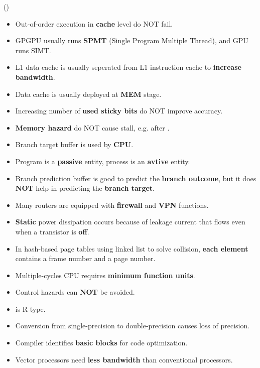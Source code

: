 \item \begin{theorem}{()} \quad\quad \begin{itemize}
        \item Out-of-order execution in \textbf{cache} level do NOT fail.
        \item GPGPU usually runs \textbf{SPMT} (Single Program Multiple Thread), and GPU runs SIMT.
        \item L1 data cache is usually seperated from L1 instruction cache to \textbf{increase bandwidth}.
        \item Data cache is usually deployed at \textbf{MEM} stage.
        \item Increasing number of \textbf{used sticky bits} do NOT improve accuracy.
        \item \textbf{Memory hazard} do NOT cause stall, e.g.  after .
        \item Branch target buffer is used by \textbf{CPU}.
        \item Program is a \textbf{passive} entity, process is an \textbf{avtive} entity.
        \item Branch prediction buffer is good to predict the \textbf{branch outcome}, but it does \textbf{NOT} help in predicting the \textbf{branch target}.
        \item Many routers are equipped with \textbf{firewall} and \textbf{VPN} functions.
        \item \textbf{Static} power dissipation occurs because of leakage current that flows even when a transistor is \textbf{off}.
        \item In hash-based page tables using linked list to solve collision, \textbf{each element} contains a frame number and a page number.
        \item Multiple-cycles CPU requires \textbf{minimum function units}.
        \item Control hazards can \textbf{NOT} be avoided.
        \item {} is R-type.
        \item Conversion from single-precision to double-precision causes loss of precision.
        \item Compiler identifies \textbf{basic blocks} for code optimization.
        \item Vector processors need \textbf{less bandwidth} than conventional processors.
    \end{itemize}
\end{theorem}
